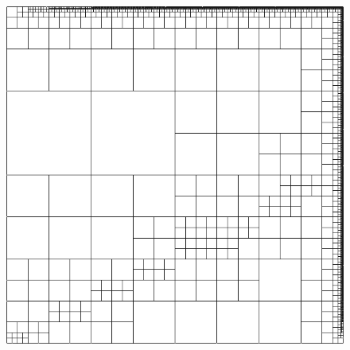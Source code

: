 \documentclass{beamer}
\begin{document}
\begin{frame}
{\begin{columns}
\begin{column}{0.49\textwidth}
\begin{figure}
\includegraphics[width=1.0\textwidth]{Confusion/modified8c_mesh.png}
\end{figure}
\end{column}
\end{columns}
}
\end{frame}

\end{document}
